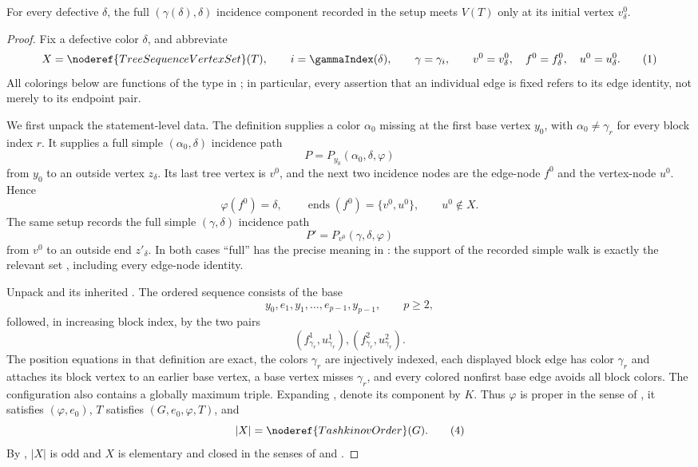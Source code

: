 \begin{lemma}
For every defective $\delta$, the full
$(\gamma(\delta),\delta)$ incidence component recorded in the setup meets
$V(T)$ only at its initial vertex $v^0_\delta$.
\end{lemma}
\begin{proof}
Fix a defective color $\delta$, and abbreviate
\[
 X=\noderef{TreeSequenceVertexSet}(T),\qquad
 i=\gammaIndex(\delta),\qquad \gamma=\gamma_i,
 \qquad v^0=v^0_\delta,\quad f^0=f^0_\delta,\quad u^0=u^0_\delta.
 \tag{1}
\]
All colorings below are functions of the type in
; in particular, every assertion that an
individual edge is fixed refers to its edge identity, not merely to its
endpoint pair.

We first unpack the statement-level data.  The definition
 supplies a color $\alpha _0$ missing at
the first base vertex $y_0$, with $\alpha _0\ne\gamma_r$ for every block
index $r$.  It supplies a full simple $(\alpha _0,\delta)$ incidence path
\[
 P=P_{y_0}(\alpha _0,\delta,\varphi)
\]
from $y_0$ to an outside vertex $z_\delta$.  Its last tree vertex is
$v^0$, and the next two incidence nodes are the edge-node $f^0$ and the
vertex-node $u^0$.  Hence
\[
 \varphi(f^0)=\delta,\qquad
 \operatorname{ends}(f^0)=\{v^0,u^0\},\qquad u^0\notin X.     \tag{2}
\]
The same setup records the full simple $(\gamma,\delta)$ incidence path
\[
 P'=P_{v^0}(\gamma,\delta,\varphi)
\]
from $v^0$ to an outside end $z'_\delta$.  In both cases ``full'' has the
precise meaning in : the support of the
recorded simple walk is exactly the relevant set
, including every edge-node identity.

Unpack  and its inherited
.  The ordered sequence consists
of the base
\[
 y_0,e_1,y_1,\ldots,e_{p-1},y_{p-1},\qquad p\geq2,
\]
followed, in increasing block index, by the two pairs
\[
 (f^1_{\gamma_r},u^1_{\gamma_r}),
 (f^2_{\gamma_r},u^2_{\gamma_r}).                            \tag{3}
\]
The position equations in that definition are exact, the colors
$\gamma_r$ are injectively indexed, each displayed block edge has color
$\gamma_r$ and attaches its block vertex to an earlier base vertex, a
base vertex misses $\gamma_r$, and every colored nonfirst base edge avoids
all block colors.  The configuration also contains a globally maximum
triple.  Expanding , denote its
 component by $K$.  Thus $\varphi$ is proper in the
sense of , it satisfies
$(\varphi,e_0)$, $T$ satisfies
$(G,e_0,\varphi,T)$, and
\[
 |X|=\noderef{TashkinovOrder}(G).                             \tag{4}
\]
By , $|X|$ is odd and $X$ is
elementary and closed in the senses of
 and
.


\end{proof}
